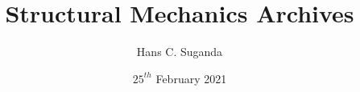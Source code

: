 \documentclass[a4paper, 12pt]{report}
\begin{document}
\title{Structural Mechanics Archives}
\author{Hans C. Suganda}
\date{$25^{th}$ February 2021}
\maketitle
\newpage

\tableofcontents

\begin{center}
\begin{comment}
Start Level: Chapter
End Level: Chapter
Aditional Comments:
\end{comment}
\end{center}
\end{document}
